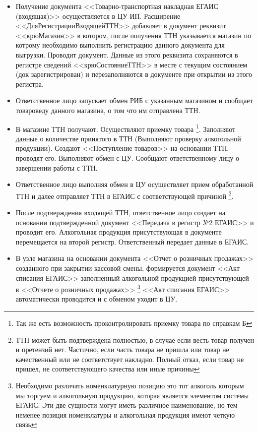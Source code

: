  \begin{itemize}
     \item Получение документа <<Товарно-транспортная накладная ЕГАИС (входящая)>> осуществляется в ЦУ ИП.
     Расширение <<ДляРегистрацииВходящейТТН>> добавляет в документ реквизит <<крюМагазин>> в котором, после получения ТТН указывается магазин по котрому необходимо выполнить регистрацию данного документа для выгрузки. Проводит документ. Данные из этого реквизита сохраняются в регистре сведений <<крюСостояниеТТН>> в месте с текущим состоянием (док зарегистрирован) и перезаполняются в документе при открытии из этого регистра.
     \item  Ответственное лицо запускает обмен РИБ с указанным магазином и сообщает товароведу данного магазина, о том что им отправлена ТТН.
     \item В магазине ТТН получают. Осуществляют приемку товара \footnote{Так же есть возможность проконтролировать приемку товара по справкам Б}. Заполняют данные о количестве принятого в ТТН (Выполняют проверку алкогольной продукции). Создают <<Поступление товаров>> на основании ТТН, проводят его. Выполняют обмен с ЦУ. Сообщают ответственному лицу о завершении работы с ТТН.
     \item Ответственное лицо выполняя обмен в ЦУ осуществляет прием обработанной ТТН и далее отправляет ТТН в ЕГАИС с соответствующей причиной \footnote{ТТН может быть подтверждена полностью, в случае если весть товар получен и претензий нет. Частично, если часть товара не пришла или товар не качественный или не соответствует накладно. Полный отказ, если товар не пришел, не соответствующего качества или иные причины}.
     \item После подтверждения входящей ТТН, ответственное лицо создает на основании подтвержденной документ <<Передача в регистр №2 ЕГАИС>>  и проводит его. Алкогольная продукция присутствующая в документе перемещается на второй регистр. Ответственный передает данные в ЕГАИС.
     \item В узле магазина  на основании документа <<Отчет о розничных продажах>> созданного при закрытии кассовой смены, формируется документ <<Акт списания ЕГАИС>> заполненный алкогольной продукцией присутствующей в <<Отчете о розничных продажах>> \footnote{Необходимо различать номенклатурную позицию это тот алкоголь которым мы торгуем и алкогольную продукцию, которая является элементом системы ЕГАИС. Эти две сущности могут иметь различное наименование, но тем неменее позиция номенклатуры и алкогольная продукция имеют четкую связь} <<Акт списания ЕГАИС>> автоматически проводится и с обменом уходит в ЦУ.

\end{itemize}
